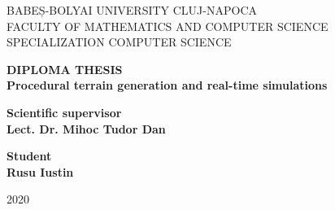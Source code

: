 \documentclass[a4paper, 12pt]{report}
\begin{document}
\begin{titlepage}

\sloppy

\begin{center}

\Large{BABEȘ-BOLYAI UNIVERSITY CLUJ-NAPOCA}\\
\vspace{0.2cm}
\Large{FACULTY OF MATHEMATICS AND COMPUTER SCIENCE}\\
\vspace{0.2cm}
\Large{SPECIALIZATION COMPUTER SCIENCE}\\

\end{center}

\vspace{2.5cm}

\begin{center}

\Huge \textbf{DIPLOMA THESIS}\\
\vspace{1 cm}
\huge \textbf{Procedural terrain generation and real-time simulations}

\end{center}

\vspace{2.5cm}

\begin{flushleft}

\Large{\textbf{Scientific supervisor}}\\
\Large{\textbf{Lect. Dr. Mihoc Tudor Dan}}

\end{flushleft}

\vspace{0.5cm}

\begin{flushright}

\Large{\textbf{Student}}\\
\Large{\textbf{Rusu Iustin}}

\end{flushright}

\vspace*{\fill}

\begin{center}

\Large{2020}

\end{center}

\end{titlepage}
\end{document}
